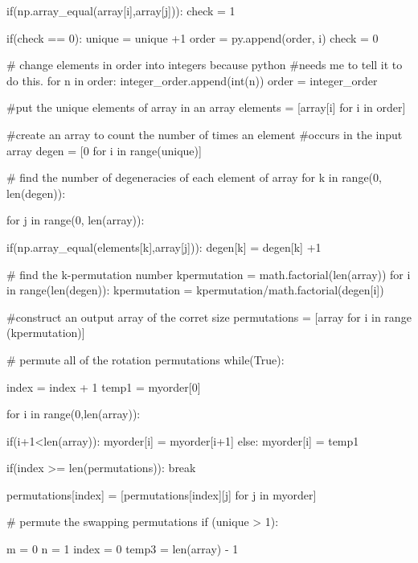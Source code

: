 \documentclass[11pt,a4paper,notitlepage]{article}
\begin{document}
\begin{code}
            if(np.array_equal(array[i],array[j])): 
                check = 1
              
        if(check == 0): 
            unique = unique +1
            order = py.append(order, i) 
        check = 0
      
    # change elements in order into integers because python
    #needs me to tell it to do this.
    for n in order: 
        integer_order.append(int(n)) 
    order = integer_order 
      
    #put the unique elements of array in an array 
    elements = [array[i] for i in order]
    
    #create an array to count the number of times an element 
    #occurs in the input array 
    degen = [0 for i in range(unique)] 
      
    # find the number of degeneracies of each element of array 
    for k in range(0, len(degen)): 
              
        for j in range(0, len(array)): 
                      
            if(np.array_equal(elements[k],array[j])): 
                degen[k] = degen[k] +1
        
    # find the k-permutation number  
    kpermutation = math.factorial(len(array))              
    for i in range(len(degen)):             
        kpermutation = kpermutation/math.factorial(degen[i]) 
      
    #construct an output array of the corret size 
    permutations = [array for i in range (kpermutation)] 
      
    # permute all of the rotation permutations 
    while(True): 
          
        index = index + 1
        temp1 = myorder[0] 
          
        for i in range(0,len(array)): 
              
            if(i+1<len(array)):         
                myorder[i] = myorder[i+1] 
            else: 
                myorder[i] = temp1 
    
        if(index >= len(permutations)): 
            break  
                      
        permutations[index] = [permutations[index][j] for j in myorder] 
  
  
    # permute the swapping permutations 
    if (unique > 1): 
          
        m = 0
        n = 1
        index = 0
        temp3 = len(array) - 1
          

\end{code}
\end{document}
